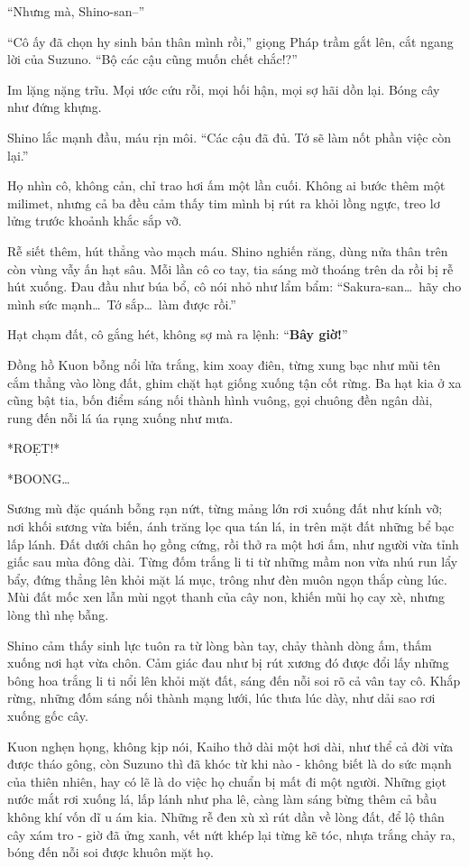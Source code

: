 \documentclass[../main.tex]{subfiles}
\begin{document}
``Nhưng mà, Shino-san--''

``Cô ấy đã chọn hy sinh bản thân mình rồi,'' giọng Pháp trầm gắt lên, cắt ngang lời của Suzuno. ``Bộ các cậu cũng muốn chết chắc!?''

Im lặng nặng trĩu. Mọi ước cứu rỗi, mọi hối hận, mọi sợ hãi dồn lại. Bóng cây như đứng khựng.

Shino lắc mạnh đầu, máu rịn môi. ``Các cậu đã đủ. Tớ sẽ làm nốt phần việc còn lại.''

Họ nhìn cô, không cản, chỉ trao hơi ấm một lần cuối. Không ai bước thêm một milimet, nhưng cả ba đều cảm thấy tim mình bị rút ra khỏi lồng ngực, treo lơ lửng trước khoảnh khắc sắp vỡ.

Rễ siết thêm, hút thẳng vào mạch máu. Shino nghiến răng, dùng nửa thân trên còn vùng vẫy ấn hạt sâu. Mỗi lần cô co tay, tia sáng mờ thoáng trên da rồi bị rễ hút xuống. Đau đầu như búa bổ, cô nói nhỏ như lẩm bẩm: ``Sakura-san\dots\ hãy cho mình sức mạnh\dots\ Tớ sắp\dots\ làm được rồi.''

Hạt chạm đất, cô gắng hét, không sợ mà ra lệnh: ``\textbf{Bây giờ!}''

Đồng hồ Kuon bỗng nổi lửa trắng, kim xoay điên, từng xung bạc như mũi tên cắm thẳng vào lòng đất, ghim chặt hạt giống xuống tận cốt rừng. Ba hạt kia ở xa cũng bật tia, bốn điểm sáng nối thành hình vuông, gọi chuông đền ngân dài, rung đến nỗi lá úa rụng xuống như mưa.

*ROẸT!*

*BOONG\dots*

Sương mù đặc quánh bỗng rạn nứt, từng mảng lớn rơi xuống đất như kính vỡ; nơi khối sương vừa biến, ánh trăng lọc qua tán lá, in trên mặt đất những bể bạc lấp lánh. Đất dưới chân họ gồng cứng, rồi thở ra một hơi ấm, như người vừa tỉnh giấc sau mùa đông dài. Từng đốm trắng li ti từ những mầm non vừa nhú run lẩy bẩy, đứng thẳng lên khỏi mặt lá mục, trông như đèn muôn ngọn thắp cùng lúc. Mùi đất mốc xen lẫn mùi ngọt thanh của cây non, khiến mũi họ cay xè, nhưng lòng thì nhẹ bẫng.

Shino cảm thấy sinh lực tuôn ra từ lòng bàn tay, chảy thành dòng ấm, thấm xuống nơi hạt vừa chôn. Cảm giác đau như bị rút xương đó được đổi lấy những bông hoa trắng li ti nổi lên khỏi mặt đất, sáng đến nỗi soi rõ cả vân tay cô. Khắp rừng, những đốm sáng nối thành mạng lưới, lúc thưa lúc dày, như dải sao rơi xuống gốc cây.

Kuon nghẹn họng, không kịp nói, Kaiho thở dài một hơi dài, như thể cả đời vừa được tháo gông, còn Suzuno thì đã khóc từ khi nào - không biết là do sức mạnh của thiên nhiên, hay có lẽ là do việc họ chuẩn bị mất đi một người. Những giọt nước mắt rơi xuống lá, lấp lánh như pha lê, càng làm sáng bừng thêm cả bầu không khí vốn dĩ u ám kia. Những rễ đen xù xì rút dần về lòng đất, để lộ thân cây xám tro - giờ đã ửng xanh, vết nứt khép lại từng kẽ tóc, nhựa trắng chảy ra, bóng đến nỗi soi được khuôn mặt họ.
\end{document}
